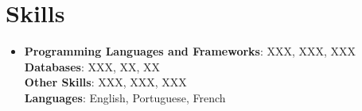\documentclass[letterpaper,11pt]{article}
\begin{document}
\section{Skills}
\begin{itemize}[leftmargin=0.15in, label={}]
    \item\small{
        \textbf{Programming Languages and Frameworks}{: XXX, XXX, XXX} \\
        \textbf{Databases}{: XXX, XX, XX} \\
        \textbf{Other Skills}{: XXX, XXX, XXX} \\
        \textbf{Languages}{: English, Portuguese, French}}
    \vspace{-4pt}
\end{itemize}
\end{document}
